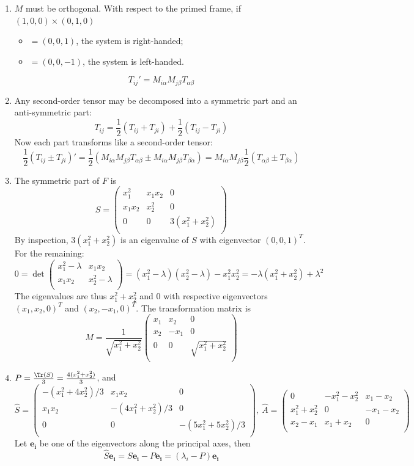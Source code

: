 \documentclass[a4paper]{article}
\begin{document}
\begin{ans}\leavevmode
\begin{enumerate}[label=(\alph*)]
\item $M$ must be orthogonal. With respect to the primed frame, if $(1,0,0)\times(0,1,0)$
\begin{itemize}
    \item $=(0,0,1)$, the system is right-handed;
    \item $=(0,0,-1)$, the system is left-handed.
\end{itemize}
$$T_{ij}'=M_{i\alpha}M_{j\beta}T_{\alpha\beta}$$
\item Any second-order tensor may be decomposed into a symmetric part and an anti-symmetric part:
$$T_{ij}=\frac{1}{2}(T_{ij}+T_{ji})+\frac{1}{2}(T_{ij}-T_{ji})$$
Now each part transforms like a second-order tensor:
$$\frac{1}{2}(T_{ij}\pm T_{ji})'=\frac{1}{2}(M_{i\alpha}M_{j\beta}T_{\alpha\beta}\pm M_{i\alpha}M_{j\beta}T_{\beta\alpha})=M_{i\alpha}M_{j\beta}\frac{1}{2}(T_{\alpha\beta}\pm T_{\beta\alpha})$$
\item The symmetric part of $F$ is 
$$S=\begin{pmatrix}x_1^2&x_1x_2&0\\x_1x_2&x_2^2&0\\0&0&3(x_1^2+x_2^2)\\\end{pmatrix}$$
By inspection, $3(x_1^2+x_2^2)$ is an eigenvalue of $S$ with eigenvector $(0,0,1)^T$. For the remaining:
$$0=\det\begin{pmatrix}x_1^2-\lambda&x_1x_2\\x_1x_2&x_2^2-\lambda\\\end{pmatrix}=(x_1^2-\lambda)(x_2^2-\lambda)-x_1^2x_2^2=-\lambda(x_1^2+x_2^2)+\lambda^2$$
The eigenvalues are thus $x_1^2+x_2^2$ and 0 with respective eigenvectors $(x_1,x_2,0)^T$ and $(x_2,-x_1,0)^T$. The transformation matrix is
$$M=\frac{1}{\sqrt{x_1^2+x_2^2}}\begin{pmatrix}x_1&x_2&0\\x_2&-x_1&0\\0&0&\sqrt{x_1^2+x_2^2}\\\end{pmatrix}$$
\item $P=\frac{\Tr(S)}{3}=\frac{4(x_1^2+x_2^2)}{3}$, and
$$\hat{S}=\begin{pmatrix}-(x_1^2+4x_2^2)/3&x_1x_2&0\\x_1x_2&-(4x_1^2+x_2^2)/3&0\\0&0&-(5x_1^2+5x_2^2)/3\\\end{pmatrix},~\hat{A}=\begin{pmatrix}0&-x_1^2-x_2^2&x_1-x_2\\x_1^2+x_2^2&0&-x_1-x_2\\x_2-x_1&x_1+x_2&0\\\end{pmatrix}$$
Let $\mathbf{e_i}$ be one of the eigenvectors along the principal axes, then
$$\hat{S}\mathbf{e_i}=S\mathbf{e_i}-P\mathbf{e_i}=(\lambda_i-P)\mathbf{e_i}$$
\end{enumerate}
\end{ans}
\end{document}
